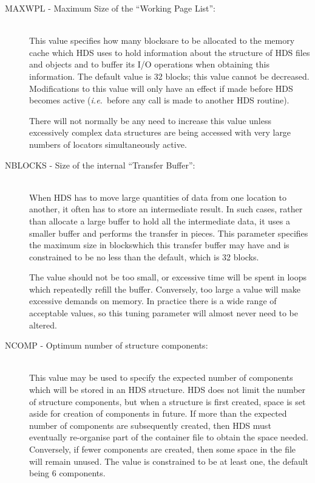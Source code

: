 \begin{description}
\item [MAXWPL - Maximum Size of the ``Working Page List'':]\mbox{}\\
This value specifies how many blocks\footnotemark[\thefootnote] are
to be allocated to the memory cache which HDS uses to hold information about
the structure of HDS files and objects and to buffer its I/O operations when
obtaining this information. The default value is 32 blocks; this value cannot
be decreased. Modifications to this value will only have an effect if made
before HDS becomes active ({\em i.e.}\ before any call is made to another HDS
routine).

There will not normally be any need to increase this value unless excessively
complex data structures are being accessed with very large numbers of locators
simultaneously active.

\item [NBLOCKS - Size of the internal ``Transfer Buffer'':]\mbox{}\\
When HDS has to move large quantities of data from one location to another, it
often has to store an intermediate result. In such cases, rather than allocate a
large buffer to hold all the intermediate data, it uses a smaller buffer and
performs the transfer in pieces. This parameter specifies the maximum size in
blocks\footnotemark[\thefootnote] which this transfer buffer may have and is
constrained to be no less than the default, which is 32 blocks.

The value should not be too small, or excessive time will be spent in loops
which repeatedly refill the buffer. Conversely, too large a value will make
excessive demands on memory. In practice there is a wide range of acceptable
values, so this tuning parameter will almost never need to be altered.

\item [NCOMP - Optimum number of structure components:]\mbox{}\\
This value may be used to specify the expected number of components which will
be stored in an HDS structure. HDS does not limit the number of structure
components, but when a structure is first created, space is set aside for
creation of components in future. If more than the expected number of
components are subsequently created, then HDS must eventually re-organise part
of the container file to obtain the space needed. Conversely, if fewer
components are created, then some space in the file will remain unused. The
value is constrained to be at least one, the default being 6 components.


\end{description}
